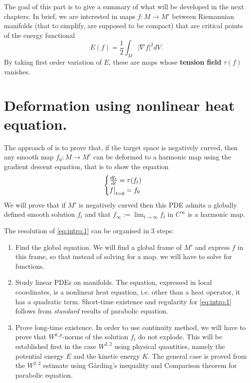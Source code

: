 \iffalse
\begin{info}
The PDF version of this page can be downloaded by replacing \texttt{html} in the its address by
\texttt{pdf}. 
For example \texttt{/html/sheaf-cohomology.html} should become \texttt{/pdf/sheaf-cohomology.pdf}.
\end{info}
\fi

\iffalse
Here is the \href{../Stage 2018/main.pdf}{memoire}.
\fi


The goal of this part is to give a summary of what will be developed in the next chapters. In brief, we are interested in
maps \(f: M \longrightarrow M'\) between Riemannian manifolds (that to simplify, are
supposed to be compact) that are critical points of the energy functional
\[
 E(f) = \frac{1}{2}\int_M |\nabla f|^2 dV.
\]
By taking first order variation of \(E\), these are maps whose \textbf{tension field} \(\tau(f)\) vanishes. 


\section{Deformation using nonlinear heat equation.}
\label{sec:orgad9272a}

The approach of \cite{eells_harmonic_1964} is to prove that, if the target space is
negatively curved, then any smooth map \(f_0: M \longrightarrow M'\) can be deformed to a
harmonic map using the gradient descent equation, that is to show the equation
\begin{equation}
\label{eq:intro:1}
\begin{cases}
\frac{df_t}{dt} = \tau(f_t)\\
\restr{f}{t=0} = f_0
\end{cases}
\end{equation}
We will prove that if \(M'\) is negatively curved then this PDE admits a globally defined smooth
solution \(f_t\) and that \(f_{\infty}:=\lim_{t\to \infty} f_t\) in \(C^\infty\) is
a harmonic map.

The resolution of \eqref{eq:intro:1} can be organised in 3 steps:
\begin{enumerate}
\item Find the global equation. We will find a global frame of \(M'\) and express
\(f\) in this frame, so that instead of solving for a map, we will have to solve for functions.
\item Study linear PDEs on manifolds. The equation, expressed in local coordinates, is a nonlinear heat equation, i.e. other
than a heat operator, it has a quadratic term. Short-time existence and regularity for \eqref{eq:intro:1} follows from \emph{standard} results of
parabolic equation.
\item Prove long-time existence. In order to use continuity method, we will have to prove
that \(W^{k,p}\)-norms of the solution \(f_t\) do not explode. This will be
established first in the case \(W^{2,2}\) using physical quantities, namely the
potential energy \(E\) and the kinetic energy \(K\). The general case is proved
from the \(W^{2,2}\) estimate using Gårding's inequality and Comparison theorem for
parabolic equation.
\end{enumerate}

